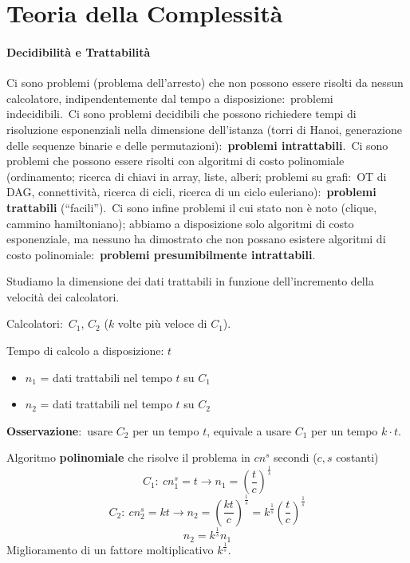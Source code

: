 \chapter{Teoria della Complessità}

\subsubsection{Decidibilità e Trattabilità}

Ci sono problemi (problema dell'arresto) che non possono essere risolti da nessun calcolatore, indipendentemente dal tempo a disposizione:\ problemi indecidibili.\
Ci sono problemi decidibili che possono richiedere tempi di risoluzione esponenziali nella dimensione dell'istanza (torri di Hanoi, generazione delle sequenze binarie e delle permutazioni):\ \textbf{problemi intrattabili}.\
Ci sono problemi che possono essere risolti con algoritmi di costo polinomiale (ordinamento; ricerca di chiavi in array, liste, alberi; problemi su grafi:\ OT di DAG, connettività, ricerca di cicli, ricerca di un ciclo euleriano):\ \textbf{problemi trattabili} (``facili'').\
Ci sono infine problemi il cui stato non è noto (clique, cammino hamiltoniano); abbiamo a disposizione solo algoritmi di costo esponenziale, ma nessuno ha dimostrato che non possano esistere algoritmi di costo polinomiale:\ \textbf{problemi presumibilmente intrattabili}.\

Studiamo la dimensione dei dati trattabili in funzione dell'incremento della velocità dei calcolatori.\

\vspace{12pt}

\noindent Calcolatori:\ $C_1$, $C_2$ ($k$ volte più veloce di $C_1$).\

\noindent Tempo di calcolo a disposizione: $t$
\begin{itemize}
    \item $n_1$ = dati trattabili nel tempo $t$ su $C_1$
    \item $n_2$ = dati trattabili nel tempo $t$ su $C_2$
\end{itemize}
\textbf{Osservazione}:\ usare $C_2$ per un tempo $t$, equivale a usare $C_1$ per un tempo $k \cdot t$.\

Algoritmo \textbf{polinomiale} che risolve il problema in $c n^s$ secondi ($c,s$ costanti)
\[C_1:\ cn_1^s = t \rightarrow n_1 = \left(\frac{t}{c}\right)^{\frac{1}{s}}\]
\[C_2:\ cn_2^s = kt \rightarrow n_2 = \left(\frac{kt}{c}\right)^{\frac{1}{s}} = k^{\frac{1}{s}}\left(\frac{t}{c}\right)^\frac{1}{s}\]
\[n_2 =k^{\frac{1}{s}}n_1\]
Miglioramento di un fattore moltiplicativo $k^{\frac{1}{s}}$.\

